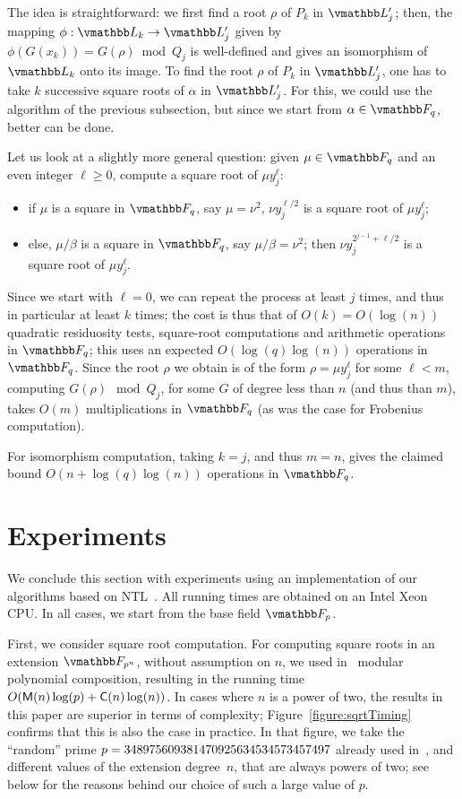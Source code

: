 The idea is straightforward: we first find a root $\rho$ of $P_k$ in
$\L'_j$; then, the mapping $\phi: \L_k \to \L'_j$ given by
$\phi(G(x_k)) = G(\rho) \bmod Q_j$ is well-defined and gives an
isomorphism of $\L_k$ onto its image. To find the root $\rho$ of
$P_k$ in $\L'_j$, one has to take $k$ successive square roots of
$\alpha$ in $\L'_j$. For this, we could use the algorithm of the
previous subsection, but since we start from $\alpha \in \F_q$, better
can be done.

Let us look at a slightly more general question: given $\mu \in \F_q$
and an even integer $\ell \ge 0$, compute a square root of $\mu
y_j^\ell$:
\begin{itemize}
\item if $\mu$ is a square in $\F_q$, say $\mu=\nu^2$, $\nu
  y_j^{\ell/2}$ is a square root of $\mu y_j^\ell$;
\item else, $\mu/\beta$ is a square in $\F_q$, say $\mu/\beta =
  \nu^2$; then $\nu y_j^{2^{j-1}+\ell/2}$ is a square root
  of $\mu y_j^\ell$.
\end{itemize}
Since we start with $\ell=0$, we can repeat the process at least $j$
times, and thus in particular at least $k$ times; the cost is thus
that of $O(k)=O(\log(n))$ quadratic residuosity tests, square-root
computations and arithmetic operations in $\F_q$; this uses an
expected $O(\log(q)\log(n))$ operations in $\F_q$.
Since the root $\rho$ we obtain is of the form $\rho=\mu
y_j^\ell$ for some $\ell < m$, computing $G(\rho) \mod Q_j$, for some
$G$ of degree less than $n$ (and thus than $m$), takes $O(m)$
multiplications in $\F_q$ (as was the case for Frobenius computation).

For isomorphism computation, taking $k=j$, and thus $m=n$, gives
the claimed bound $O(n + \log(q)\log(n))$ operations in $\F_q$.


\section{Experiments}\label{sec:exp}

We conclude this section with experiments using an implementation of
our algorithms based on NTL~\cite{NTL2009}. All running times are
obtained on an Intel Xeon CPU. In all cases, we start from the base
field $\F_p$.

First, we consider square root computation. For computing square roots
in an extension $\F_{p^n}$, without assumption on $n$, we used
in~\cite{DlsSch2011} modular polynomial composition, resulting in the
running time $O(\mathsf{M}(n)\log(p) + \mathsf{C}(n)\log(n))$. In cases where $n$ is
a power of two, the results in this paper are superior in terms of
complexity; Figure~\ref{figure:sqrtTiming} confirms that this is also
the case in practice. In that figure, we take the ``random'' prime $p
= \seqsplit{348975609381470925634534573457497}$ already used
in~\cite{DlsSch2011}, and different values of the extension degree~$n$,
that are always powers of two; see below for the reasons behind our
choice of such a large value of $p$.

